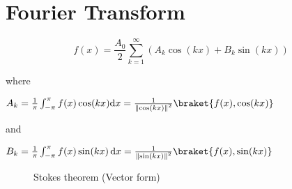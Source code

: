 \chapter{Fourier Transform}

\begin{definition}
\[
        f(x) = \frac{A_0}{2}\sum_{k=1}^{\infty}   (A_k \cos (kx)+B_k \sin (kx))
\]
\end{definition}
where
\begin{definition}
    \(
    A_k = \frac{1}{\pi} \int_{-\pi} ^\pi f(x) \cos (kx) \mathrm{d}x = \frac{1}{\left\lVert \cos (kx)\right\rVert ^{2}}  \braket{f(x), \cos (kx)}
    \)
\end{definition}
and
\begin{definition}
    \(
       B_k = \frac{1}{\pi}\int_{-\pi}^{\pi} f(x) \sin (kx)\,\mathrm{d}x = \frac{1}{\left\lVert \sin (kx)\right\rVert ^{2} } \braket{f(x), \sin (kx)}
    \)
\end{definition}

\begin{figure}[h]
    \centering
    
    \caption{Stokes theorem (Vector form)}
    \label{fig:1}
\end{figure}

